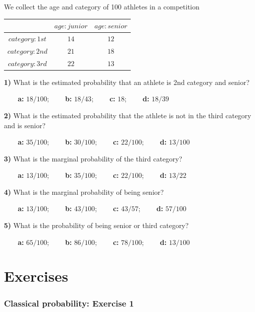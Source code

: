 \documentclass[
]{book}
\begin{document}
We collect the age and category of 100 athletes in a competition

\begin{longtable}[]{@{}ccc@{}}
\toprule
& \(age:junior\) & \(age:senior\) \\
\midrule
\endhead
\(category:1st\) & \(14\) & \(12\) \\
\(category:2nd\) & \(21\) & \(18\) \\
\(category:3rd\) & \(22\) & \(13\) \\
\bottomrule
\end{longtable}

\textbf{1)} What is the estimated probability that an athlete is 2nd category and senior?

\textbf{\(\qquad\)a:} \(18/100\); \textbf{\(\qquad\)b:} \(18/43\); \textbf{\(\qquad\)c:} \(18\); \textbf{\(\qquad\)d:} \(18/39\)

\textbf{2)} What is the estimated probability that the athlete is not in the third category and is senior?

\textbf{\(\qquad\)a:} \(35/100\); \textbf{\(\qquad\)b:} \(30/100\); \textbf{\(\qquad\)c:} \(22/100\); \textbf{\(\qquad\)d:} \(13/100\)

\textbf{3)} What is the marginal probability of the third category?

\textbf{\(\qquad\)a:} \(13/100\); \textbf{\(\qquad\)b:} \(35/100\); \textbf{\(\qquad\)c:} \(22/100\); \textbf{\(\qquad\)d:} \(13/22\)

\textbf{4)} What is the marginal probability of being senior?

\textbf{\(\qquad\)a:} \(13/100\); \textbf{\(\qquad\)b:} \(43/100\); \textbf{\(\qquad\)c:} \(43/57\); \textbf{\(\qquad\)d:} \(57/100\)

\textbf{5)} What is the probability of being senior or third category?

\textbf{\(\qquad\)a:} \(65/100\); \textbf{\(\qquad\)b:} \(86/100\); \textbf{\(\qquad\)c:} \(78/100\); \textbf{\(\qquad\)d:} \(13/100\)

\hypertarget{exercises-1}{%
\section{Exercises}\label{exercises-1}}

\hypertarget{classical-probability-exercise-1}{%
\subsubsection{Classical probability: Exercise 1}\label{classical-probability-exercise-1}}
\end{document}
